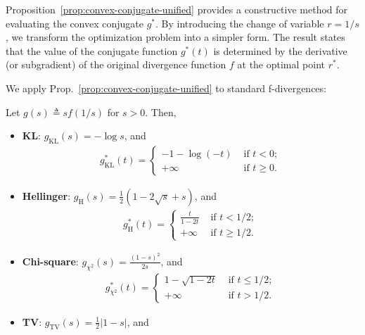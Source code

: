 Proposition~\ref{prop:convex-conjugate-unified} provides a constructive method for evaluating the convex conjugate $g^{\ast}$. By introducing the change of variable $r = 1/s$, we transform the optimization problem into a simpler form. The result states that the value of the conjugate function $g^\ast(t)$ is determined by the derivative (or subgradient) of the original divergence function $f$ at the optimal point $r^\ast$.

We apply Prop.~\ref{prop:convex-conjugate-unified} to standard f-divergences:
{
\renewcommand{\thecorollary}{P1}
\begin{corollary}\label{cor:convex-conjugate}
    \normalfont
    Let $g(s) \triangleq sf(1/s)$ for $s > 0$. Then, 
    \begin{itemize}[leftmargin=*]
        \item \textbf{KL}: $g_{\mathrm{KL}}(s) = -\log s$, and 
        \begin{align}
            g^{\ast}_{\mathrm{KL}}(t) = 
            \begin{cases}
                 -1-\log(-t) & \text{ if } t < 0; \\ 
                 +\infty &\text{ if } t \geq 0.
            \end{cases}
        \end{align}
        \item \textbf{Hellinger}: $g_{\mathrm{H}}(s) = \frac{1}{2}(1-2\sqrt{s} + s)$, and 
        \begin{align}
            g^{\ast}_{\mathrm{H}}(t) = 
            \begin{cases}
                 \frac{t}{1-2t} & \text{ if } t < 1/2; \\ 
                 +\infty &\text{ if } t \geq 1/2.
            \end{cases}
        \end{align}
        \item \textbf{Chi-square}: $g_{\chi^2}(s) = \frac{(1-s)^2}{2s}$, and  
        \begin{align}
            g^{\ast}_{\chi^2}(t)  = 
            \begin{cases}
                 1-\sqrt{1-2t} & \text{ if } t \leq 1/2; \\ 
                 +\infty &\text{ if } t > 1/2.
            \end{cases}
        \end{align}
        \item \textbf{TV}: $g_{\mathrm{TV}}(s) = \frac{1}{2}|1-s|$, and 
        \begin{align}

\end{align}
\end{itemize}
\end{corollary}}
